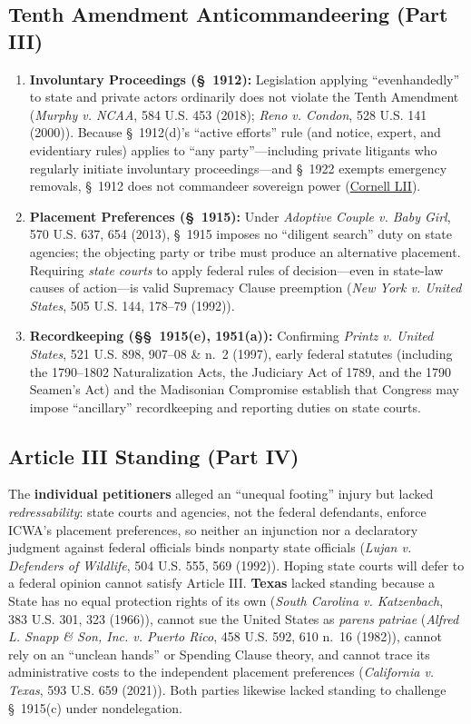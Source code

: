 \documentclass[12pt]{article}
\begin{document}
\subsection{Tenth Amendment Anticommandeering (Part III)}
\begin{enumerate}
    \item \textbf{Involuntary Proceedings (\S~1912):} Legislation applying ``evenhandedly'' to state and private actors ordinarily does not violate the Tenth Amendment (\textit{Murphy v. NCAA}, 584 U.S. 453 (2018); \textit{Reno v. Condon}, 528 U.S. 141 (2000)). Because \S~1912(d)'s ``active efforts'' rule (and notice, expert, and evidentiary rules) applies to ``any party''---including private litigants who regularly initiate involuntary proceedings---and \S~1922 exempts emergency removals, \S~1912 does not commandeer sovereign power (\href{https://www.law.cornell.edu/supremecourt/text/21-376}{Cornell LII}).
    \item \textbf{Placement Preferences (\S~1915):} Under \textit{Adoptive Couple v. Baby Girl}, 570 U.S. 637, 654 (2013), \S~1915 imposes no ``diligent search'' duty on state agencies; the objecting party or tribe must produce an alternative placement. Requiring \emph{state courts} to apply federal rules of decision---even in state-law causes of action---is valid Supremacy Clause preemption (\textit{New York v. United States}, 505 U.S. 144, 178--79 (1992)).
    \item \textbf{Recordkeeping (\S\S~1915(e), 1951(a)):} Confirming \textit{Printz v. United States}, 521 U.S. 898, 907--08 \& n.~2 (1997), early federal statutes (including the 1790--1802 Naturalization Acts, the Judiciary Act of 1789, and the 1790 Seamen's Act) and the Madisonian Compromise establish that Congress may impose ``ancillary'' recordkeeping and reporting duties on state courts.
\end{enumerate}

\subsection{Article III Standing (Part IV)}
The \textbf{individual petitioners} alleged an ``unequal footing'' injury but lacked \emph{redressability}: state courts and agencies, not the federal defendants, enforce ICWA's placement preferences, so neither an injunction nor a declaratory judgment against federal officials binds nonparty state officials (\textit{Lujan v. Defenders of Wildlife}, 504 U.S. 555, 569 (1992)). Hoping state courts will defer to a federal opinion cannot satisfy Article III. \textbf{Texas} lacked standing because a State has no equal protection rights of its own (\textit{South Carolina v. Katzenbach}, 383 U.S. 301, 323 (1966)), cannot sue the United States as \textit{parens patriae} (\textit{Alfred L. Snapp \& Son, Inc. v. Puerto Rico}, 458 U.S. 592, 610 n.~16 (1982)), cannot rely on an ``unclean hands'' or Spending Clause theory, and cannot trace its administrative costs to the independent placement preferences (\textit{California v. Texas}, 593 U.S. 659 (2021)). Both parties likewise lacked standing to challenge \S~1915(c) under nondelegation.
\end{document}
